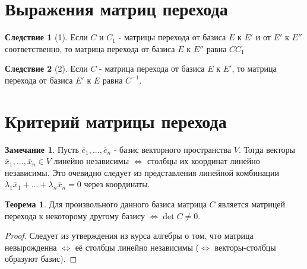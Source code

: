 \documentclass[a4paper, 12pt]{article}
\theoremstyle{definition}
\newtheorem*{theorem}{Теорема}
\newtheorem*{consequense}{Следствие}
\newtheorem*{remark}{Замечание}
\begin{document}
	\section{Выражения матриц перехода}
	\begin{consequense}[1]
		Если $C$ и $C_{1}$ - матрицы перехода от базиса $E$ к $E'$ и от $E'$ к $E''$ соответственно, то матрица перехода от базиса $E$ к $E''$ равна $CC_{1}$
	\end{consequense}
	\begin{consequense}[2]
		Если $C$ - матрица перехода от базиса $E$ к $E'$, то матрица перехода от базиса $E'$ к $E$ равна $C^{-1}$.
	\end{consequense}
	\section{Критерий матрицы перехода}
	\begin{remark}
		Пусть $\bar{e}_{1},...,\bar{e}_{n}$ - базис векторного пространства $V$. Тогда векторы $\bar{x}_{1},...,\bar{x}_{n} \in V$ линейно независимы $\Leftrightarrow$ столбцы их координат линейно независимы. Это очевидно следует из представления линейной комбинации $\lambda_{1}\bar{x}_{1} + ... + \lambda_{n}\bar{x}_{n} = 0$ через координаты. 
	\end{remark}
	\begin{theorem}
		Для произвольного данного базиса матрица $C$ является матрицей перехода к некоторому другому базису $\Leftrightarrow \det C \neq 0$. 
	\end{theorem}
	\begin{proof}
		Следует из утверждения из курса алгебры о том, что матрица невырожденна $\Leftrightarrow$ её столбцы линейно независимы ($\Leftrightarrow$ векторы-столбцы образуют базис). 
	\end{proof}
\end{document}
